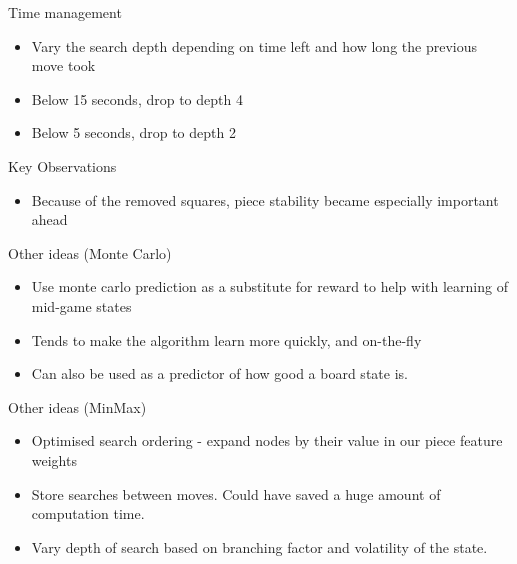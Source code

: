 \documentclass{beamer}
\begin{document}
\begin{frame}{Time management}
    \begin{itemize}
  \item
    Vary the search depth depending on time left and how long the previous move took
  \item
    Below 15 seconds, drop to depth 4
  \item
     Below 5 seconds, drop to depth 2  
  \end{itemize}
\end{frame}

\begin{frame}{Key Observations}
    \begin{itemize}
  \item
    Because of the removed squares, piece stability became especially important ahead
  \end{itemize}
\end{frame}

\begin{frame}{Other ideas (Monte Carlo)}
    \begin{itemize}
  \item
    	Use monte carlo prediction as a substitute for reward to help with learning of mid-game states
  \item
	Tends to make the algorithm learn more quickly, and on-the-fly
  \item
	Can also be used as a predictor of how good a board state is.
  \end{itemize}
\end{frame}

\begin{frame}{Other ideas (MinMax)}
    \begin{itemize}
  \item
    Optimised search ordering - expand nodes by their value in our piece feature weights
  \item
	Store searches between moves. Could have saved a huge amount of computation time.
  \item
	Vary depth of search based on branching factor and volatility of the state.
  \end{itemize}
\end{frame}
\end{document}

